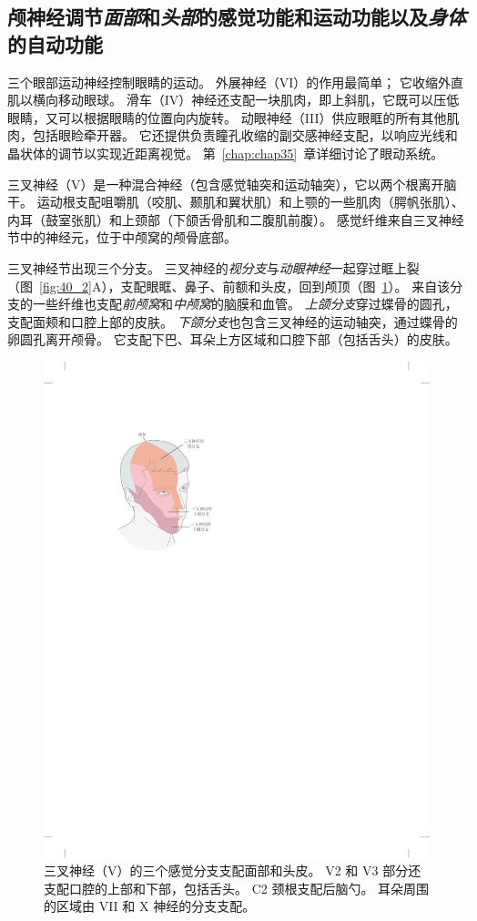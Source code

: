 \subsection{颅神经调节\textit{面部}和\textit{头部}的感觉功能和运动功能以及\textit{身体}的自动功能}

三个眼部运动神经控制眼睛的运动。
外展神经（VI）的作用最简单；
它收缩外直肌以横向移动眼球。
滑车（IV）神经还支配一块肌肉，即上斜肌，它既可以压低眼睛，又可以根据眼睛的位置向内旋转。
动眼神经（III）供应眼眶的所有其他肌肉，包括眼睑牵开器。
它还提供负责瞳孔收缩的副交感神经支配，以响应光线和晶状体的调节以实现近距离视觉。
第~\ref{chap:chap35}~章详细讨论了眼动系统。


三叉神经（V）是一种混合神经（包含感觉轴突和运动轴突），它以两个根离开脑干。
运动根支配咀嚼肌（咬肌、颞肌和翼状肌）和上颚的一些肌肉（腭帆张肌）、内耳（鼓室张肌）和上颈部（下颌舌骨肌和二腹肌前腹）。
感觉纤维来自三叉神经节中的神经元，位于中颅窝的颅骨底部。


三叉神经节出现三个分支。
三叉神经的\textit{视分支}与\textit{动眼神经}一起穿过眶上裂（图~\ref{fig:40_2}A），支配眼眶、鼻子、前额和头皮，回到颅顶（图~\ref{fig:40_3}）。
来自该分支的一些纤维也支配\textit{前颅窝}和\textit{中颅窝}的脑膜和血管。
\textit{上颌分支}穿过蝶骨的圆孔，支配面颊和口腔上部的皮肤。
\textit{下颌分支}也包含三叉神经的运动轴突，通过蝶骨的卵圆孔离开颅骨。
它支配下巴、耳朵上方区域和口腔下部（包括舌头）的皮肤。


\begin{figure}[htbp]
	\centering
	\includegraphics[width=0.44\linewidth]{chap40/fig_40_3}
	\caption{三叉神经（V）的三个感觉分支支配面部和头皮。
		V2 和 V3 部分还支配口腔的上部和下部，包括舌头。
		C2 颈根支配后脑勺。
		耳朵周围的区域由 VII 和 X 神经的分支支配。}
	\label{fig:40_3}
\end{figure}


